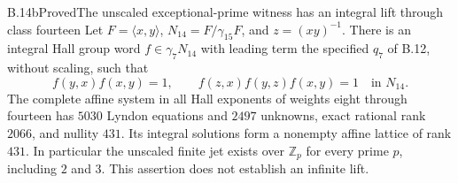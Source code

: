 \begin{statement}{B.14b}{Proved}{The unscaled exceptional-prime witness has an integral lift through class fourteen}
Let $F=\langle x,y\rangle$, $N_{14}=F/\gamma_{15}F$,
and $z=(xy)^{-1}$. There is an integral Hall group word
$f\in\gamma_7N_{14}$ with leading term the specified $q_7$ of
B.12, without scaling, such that
\[
 f(y,x)f(x,y)=1,\qquad
 f(z,x)f(y,z)f(x,y)=1
 \quad\text{in }N_{14}.
\]
The complete affine system in all Hall exponents of weights
eight through fourteen has $5030$ Lyndon equations and $2497$
unknowns, exact rational rank $2066$, and nullity $431$.
Its integral solutions form a nonempty affine lattice of rank
$431$. In particular the unscaled finite jet exists over
$\mathbb Z_p$ for every prime $p$, including $2$ and $3$.
This assertion does not establish an infinite lift.
\end{statement}
